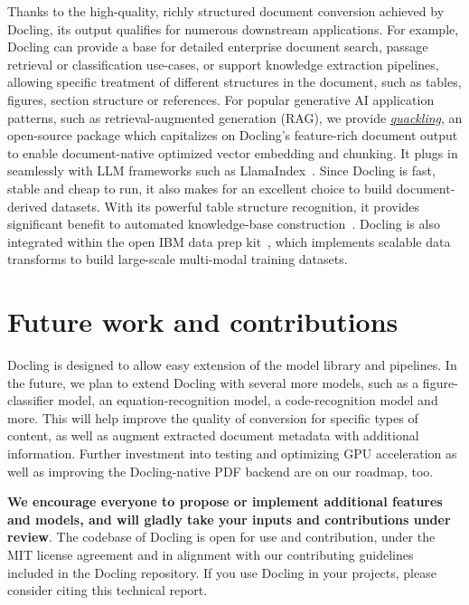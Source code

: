 \documentclass{article}
\begin{document}
Thanks to the high-quality, richly structured document conversion achieved by Docling, its output qualifies for numerous downstream applications. For example, Docling can provide a base for detailed enterprise document search, passage retrieval or classification use-cases, or support knowledge extraction pipelines, allowing specific treatment of different structures in the document, such as tables, figures, section structure or references. 
For popular generative AI application patterns, such as retrieval-augmented generation (RAG), we provide \textit{\href{https://pypi.org/project/quackling/}{quackling}}, an open-source package which capitalizes on Docling's feature-rich document output to enable document-native optimized vector embedding and chunking. It plugs in seamlessly with LLM frameworks such as LlamaIndex~\cite{Liu_LlamaIndex_2022}.
Since Docling is fast, stable and cheap to run, it also makes for an excellent choice to build document-derived datasets. With its powerful table structure recognition, it provides significant benefit to automated knowledge-base construction~\cite{Morin2024,mishra-etal-2024-statements}.   
Docling is also integrated within the open IBM data prep kit~\cite{dpk}, which implements scalable data transforms to build large-scale multi-modal training datasets.


\section{Future work and contributions}

Docling is designed to allow easy extension of the model library and pipelines. In the future, we plan to extend Docling with several more models, such as a figure-classifier model, an equation-recognition model, a code-recognition model and more. This will help improve the quality of conversion for specific types of content, as well as augment extracted document metadata with additional information. Further investment into testing and optimizing GPU acceleration as well as improving the Docling-native PDF backend are on our roadmap, too.

\textbf{We encourage everyone to propose or implement additional features and models, and will gladly take your inputs and contributions under review}. The codebase of Docling is open for use and contribution, under the MIT license agreement and in alignment with our contributing guidelines included in the Docling repository. If you use Docling in your projects, please consider citing this technical report.
\end{document}
